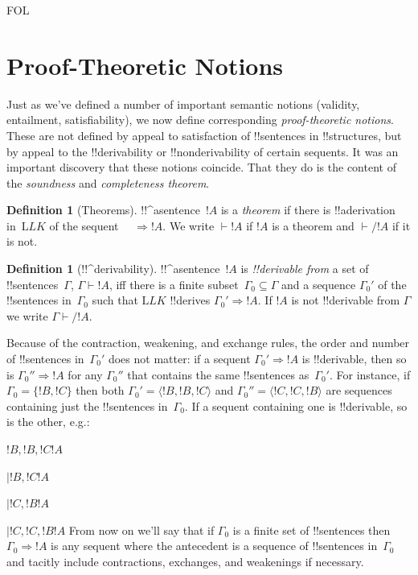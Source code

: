 \documentclass[10pt,a4paper]{article}
\theoremstyle{plain}
\theoremstyle{definition}
\newtheorem{defn}[thm]{Definition}
\theoremstyle{remark}
\newenvironment{explain}{}{}
\newcommand*{\olfileid}[3]{}
\newcommand*{\olsection}[1]{\section*{#1}}
\providecommand{\AxiomC}[1]{}
\providecommand{\RightLabel}[1]{}
\providecommand{\fCenter}{}
\newenvironment{prooftree}{}{}
\providecommand{\Sequent}{\mathrel{\Rightarrow}}
\providecommand{\Proves}{\mathrel{\vdash}}
\providecommand{\Log}{\ensuremath{\mathrm{L}}}
\providecommand{\tuple}[1]{\langle #1 \rangle}
\providecommand{\iftag}[1]{#1}
\providecommand{\LeftR}[1]{}
\providecommand{\Deduce}{\mathrm{D}}
\providecommand{\UnaryInf}{\ensuremath{\mid}}
\providecommand{\Weakening}{\mathrm{Wk}}
\providecommand{\LeftR}{\mathrm{L}}
\begin{document}
\iftag{FOL}
      {\olfileid{fol}{seq}{ptn}}
      {\olfileid{pl}{seq}{ptn}}

\olsection{Proof-Theoretic Notions}

\begin{explain}
Just as we've defined a number of important semantic notions
(validity, entailment, satisfiability), we now define corresponding
\emph{proof-theoretic notions}.  These are not defined by appeal to
satisfaction of !!{sentence}s in !!{structure}s, but by appeal to the
!!{derivability} or !!{nonderivability} of certain sequents.  It was
an important discovery that these notions coincide.  That they do is
the content of the \emph{soundness} and \emph{completeness theorem}.
\end{explain}

\begin{defn}[Theorems]
!!^a{sentence}~$!A$ is a \emph{theorem} if there is !!a{derivation}
in~$\Log{LK}$ of the sequent $\quad \Sequent !A$.  We write $\Proves
!A$ if $!A$ is a theorem and $\Proves/ !A$ if it is not.
\end{defn}

\begin{defn}[!!^{derivability}]
!!^a{sentence}~$!A$ is \emph{!!{derivable} from} a set of
!!{sentence}s~$\Gamma$, $\Gamma \Proves !A$, iff there is a
finite subset~$\Gamma_0 \subseteq \Gamma$ and a sequence $\Gamma_0'$
of the !!{sentence}s in~$\Gamma_0$ such that $\Log{LK}$ !!{derive}s
$\Gamma_0' \Sequent !A$.  If $!A$ is not !!{derivable} from $\Gamma$
we write $\Gamma \Proves/ !A$.
\end{defn}

Because of the contraction, weakening, and exchange rules, the order
and number of !!{sentence}s in~$\Gamma_0'$ does not matter: if a
sequent $\Gamma_0' \Sequent !A$ is !!{derivable}, then so is
$\Gamma_0'' \Sequent !A$ for any $\Gamma_0''$ that contains the same
!!{sentence}s as~$\Gamma_0'$.  For instance, if $\Gamma_0 = \{!B, !C\}$
then both $\Gamma_0' = \tuple{!B, !B, !C}$ and $\Gamma_0'' =
\tuple{!C, !C, !B}$ are sequences containing just the !!{sentence}s
in~$\Gamma_0$. If a sequent containing one is !!{derivable}, so is the
other, e.g.:
\begin{prooftree}
  \AxiomC{}
  \Deduce$!B, !B, !C \fCenter !A$
  \RightLabel{\LeftR{\Contraction}}
  \UnaryInf$!B, !C \fCenter !A$
  \RightLabel{\LeftR{\Exchange}}
  \UnaryInf$!C, !B \fCenter !A$
  \RightLabel{\LeftR{\Weakening}}
  \UnaryInf$!C, !C, !B \fCenter !A$
\end{prooftree}
From now on we'll say that if $\Gamma_0$ is a finite set of
!!{sentence}s then $\Gamma_0 \Sequent !A$ is any sequent where the
antecedent is a sequence of !!{sentence}s in~$\Gamma_0$ and tacitly include
contractions, exchanges, and weakenings if necessary.
\end{document}
